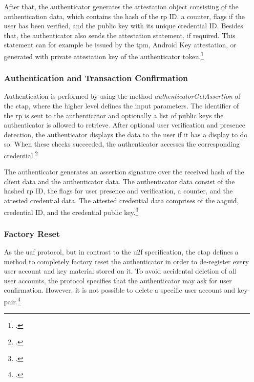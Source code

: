 After that, the authenticator generates the attestation object consisting of the authentication data, which contains the hash of the \gls{rp} ID, a counter, flags if the user has been verified, and the public key with its unique credential ID. Besides that, the authenticator also sends the attestation statement, if required. This statement can for example be issued by the \gls{tpm}, Android Key attestation, or generated with private attestation key of the authenticator token.\footcites[See][9]{ctap2}[See][Chapter 8]{w3c}

\subsubsection{Authentication and Transaction Confirmation}

Authentication is performed by using the method \textit{authenticatorGetAssertion} of the \gls{ctap}, where the higher level \wa{} defines the input parameters. The identifier of the \gls{rp} is sent to the authenticator and optionally a list of public keys the authenticator is allowed to retrieve. After optional user verification and presence detection, the authenticator displays the data to the user if it has a display to do so. When these checks succeeded, the authenticator accesses the corresponding credential.\footcites[See][11-13]{ctap2}

The authenticator generates an assertion signature over the received hash of the client data and the authenticator data. The authenticator data consist of the hashed \gls{rp} ID, the flags for user presence and verification, a counter, and the attested credential data. The attested credential data comprises of the \gls{aaguid}, credential ID, and the credential public key.\footcites[See][Chapter 6.4.1.]{w3c}

\subsubsection{Factory Reset}

As the \gls{uaf} protocol, but in contrast to the \gls{u2f} specification, the \gls{ctap} defines a method to completely factory reset the authenticator in order to de-register every user account and key material stored on it. To avoid accidental deletion of all user accounts, the protocol specifies that the authenticator may ask for user confirmation. However, it is not possible to delete a specific user account and key-pair.\footcites[See][26]{ctap2}

